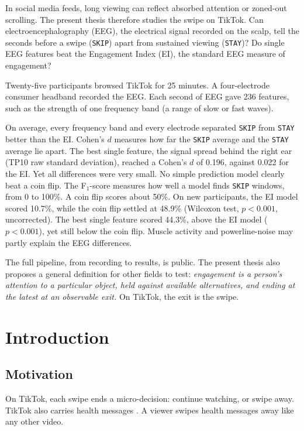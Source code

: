 \documentclass[12pt,a4paper]{report}
\begin{document}
In social media feeds, long viewing can reflect absorbed attention or zoned-out scrolling. The present thesis therefore studies the swipe on TikTok. Can electroencephalography (EEG), the electrical signal recorded on the scalp, tell the seconds before a swipe (\texttt{SKIP}) apart from sustained viewing (\texttt{STAY})? Do single EEG features beat the Engagement Index (EI), the standard EEG measure of engagement?

Twenty-five participants browsed TikTok for 25 minutes. A four-electrode consumer headband recorded the EEG. Each second of EEG gave 236 features, such as the strength of one frequency band (a range of slow or fast waves).

On average, every frequency band and every electrode separated \texttt{SKIP} from \texttt{STAY} better than the EI. Cohen's $d$ measures how far the \texttt{SKIP} average and the \texttt{STAY} average lie apart. The best single feature, the signal spread behind the right ear (TP10 raw standard deviation), reached a Cohen's $d$ of 0.196, against 0.022 for the EI. Yet all differences were very small. No simple prediction model clearly beat a coin flip. The F\(_1\)-score measures how well a model finds \texttt{SKIP} windows, from 0 to 100\%. A coin flip scores about 50\%. On new participants, the EI model scored 10.7\%, while the coin flip settled at 48.9\% (Wilcoxon test, $p<0.001$, uncorrected). The best single feature scored 44.3\%, above the EI model ($p<0.001$), yet still below the coin flip. Muscle activity and powerline-noise may partly explain the EEG differences.

The full pipeline, from recording to results, is public. The present thesis also proposes a general definition for other fields to test: \emph{engagement is a person's attention to a particular object, held against available alternatives, and ending at the latest at an observable exit.} On TikTok, the exit is the swipe.

\chapter{Introduction}
\label{chap:introduction}

\section{Motivation}

On TikTok, each swipe ends a micro-decision: continue watching, or swipe away. TikTok also carries health messages \cite{mccashin_using_2023}. A viewer swipes health messages away like any other video.
\end{document}

